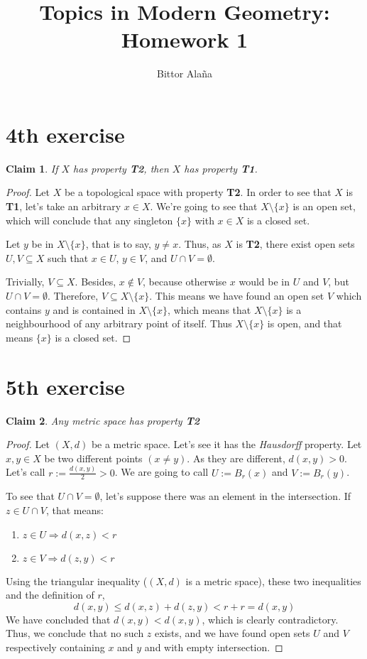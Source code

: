 \documentclass[10pt,a4paper]{article}
\author{Bittor Alaña}
\title{Topics in Modern Geometry: Homework 1}
\newtheorem*{lemma}{Claim}
\begin{document}
\maketitle

\section*{4th exercise}
\begin{lemma}
If $X$ has property \textbf{T2}, then $X$ has property \textbf{T1}.  
\end{lemma}

\begin{proof}
Let $X$ be a topological space with property \textbf{T2}. In order to see that $X$ is \textbf{T1}, let's take an arbitrary $x\in X$. We're going to see that $X\setminus \{ x \}$ is an open set, which will conclude that any singleton $\{ x\}$ with $x\in X$ is a closed set. 

Let $y$ be in $X\setminus \{ x \}$, that is to say, $y\neq x$. Thus, as $X$ is \textbf{T2}, there exist open sets $U,V \subseteq X$ such that $x\in U$, $y\in V$, and $U \cap V = \emptyset$. 

Trivially, $V\subseteq X$. Besides, $x\notin V$, because otherwise $x$ would be in $U$ and $V$, but $U \cap V = \emptyset$. Therefore, $V\subseteq X\setminus \{ x \}$. This means we have found an open set $V$ which contains $y$ and is contained in $X\setminus \{ x \}$, which means that $X\setminus \{ x \}$ is a neighbourhood of any arbitrary point of itself. Thus $X\setminus \{ x \}$ is open, and that means $\{ x \}$ is a closed set.
\end{proof}

\section*{5th exercise}
\begin{lemma}
Any metric space has property \textbf{T2}
\end{lemma}

\begin{proof}
Let $(X,d)$ be a metric space. Let's see it has the \textit{Hausdorff} property.
Let $x,y\in X$ be two different points $(x \neq y)$. As they are different, $d(x,y) > 0$. 
Let's call $r:=\frac{d(x,y)}{2}>0$. We are going to call $U:=B_r(x)$  and $V:=B_r(y)$. 

To see that $U\cap V=\emptyset$, let's suppose there was an element in the intersection. If $z\in U\cap V$, that means:
\begin{enumerate}
\item $z\in U\Rightarrow d(x,z) < r$
\item $z\in V\Rightarrow d(z,y) < r$
\end{enumerate} 
Using the triangular inequality ($(X,d)$ is a metric space), these two inequalities and the definition of $r$,
\[d(x,y) \leq d(x,z) + d(z,y) < r + r = d(x,y) \]
We have concluded that $d(x,y)<d(x,y)$, which is clearly contradictory. Thus, we conclude that no such $z$ exists, and we have found open sets $U$ and $V$ respectively containing $x$ and $y$ and with empty intersection.
\end{proof}
\end{document}
